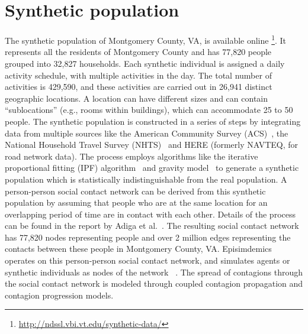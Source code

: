 \documentclass[doublespace,draft]{VTthesis}
\begin{document}
    \section{Synthetic population}
    The synthetic population of Montgomery County, VA, is available online \footnote{\url{http://ndssl.vbi.vt.edu/synthetic-data/}}. It represents all the residents of Montgomery County and has 77,820 people grouped into 32,827 households. Each synthetic individual is assigned a daily activity schedule, with multiple activities in the day. The total number of activities is 429,590, and these activities are carried out in 26,941 distinct geographic locations. A location can have different sizes and can contain ``sublocations'' (e.g., rooms within buildings), which can accommodate 25 to 50 people. The synthetic population is constructed in a series of steps by integrating data from multiple sources like the American Community Survey (ACS)~\cite{mather2005american}, the National Household Travel Survey (NHTS)~\cite{NHTS11} and HERE (formerly NAVTEQ, for road network data). The process employs algorithms like the iterative proportional fitting (IPF) algorithm~\cite{BBM96} and gravity model~\cite{erlander90gravityModel} to generate a synthetic population which is statistically indistinguishable from the real population. A person-person social contact network can be derived from this synthetic population by assuming that people who are at the same location for an overlapping period of time are in contact with each other. Details of the process can be found in the report by Adiga et al.~\cite{adiga15US}. The resulting social contact network has 77,820 nodes representing people and over 2 million edges representing the contacts between these people in Montgomery County, VA. Episimdemics operates on this person-person social contact network, and simulates agents or synthetic individuals as nodes of the network ~\cite{swarup14challenge}. The spread of contagions through the social contact network is modeled through coupled contagion propagation and contagion progression models.
    
\end{document}

